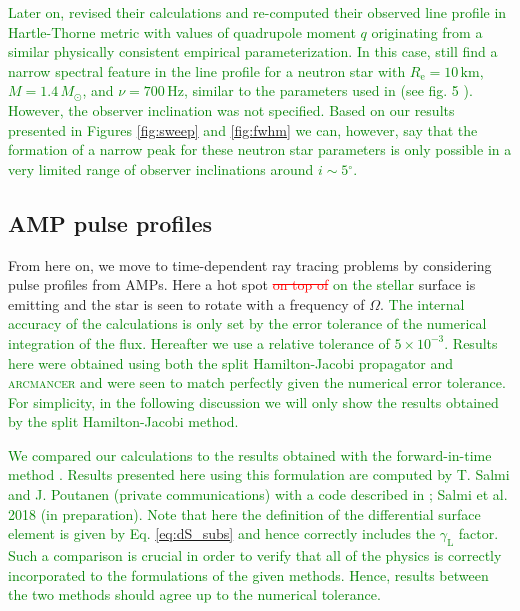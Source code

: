 \documentclass{aa}
\newcommand{\refe}[1]{\textcolor{green}{{#1}}}
\newcommand{\refedel}[1]{\textcolor{red}{\sout{#1}}}
\newcommand{\Msun}{\ensuremath{M_{\odot}}}
\newcommand{\lgamma}{\gamma_{\text{L}}}
\renewcommand{\deg}{\ensuremath{^{\circ}}}
\begin{document}
\refe{
Later on, \citet{BBP13} revised their calculations and re-computed their observed line profile in Hartle-Thorne metric with values of quadrupole moment $q$ originating from a similar physically consistent empirical parameterization.
In this case, \citet{BBP13} still find a narrow spectral feature in the line profile for a neutron star with $R_{\mathrm{e}} = 10\,\mathrm{km}$, $M=1.4\,\Msun$, and $\nu = 700\,\mathrm{Hz}$, similar to the parameters used in \citet{BPO13} (see fig. 5 \citealt{BBP13}).
However, the observer inclination was not specified.
Based on our results presented in Figures \ref{fig:sweep} and \ref{fig:fwhm} we can, however, say that the formation of a narrow peak for these neutron star parameters is only possible in a very limited range of observer inclinations around $i \sim 5\deg$.
}




\subsection{AMP pulse profiles}\label{sect:AMPs}

From here on, we move to time-dependent ray tracing problems by considering pulse profiles from AMPs.
Here a hot spot \refedel{on top of} \refe{on the stellar} surface is emitting and the star is seen to rotate with a frequency of $\Omega$.
\refe{The internal accuracy of the calculations is only set by the error tolerance of the numerical integration of the flux.
Hereafter we use a relative tolerance of $5 \times 10^{-3}$.
Results here were obtained using both the split Hamilton-Jacobi propagator and \textsc{arcmancer} and were seen to match perfectly given the numerical error tolerance.
For simplicity, in the following discussion we will only show the results obtained by the split Hamilton-Jacobi method.
}

\refe{
We compared our calculations to the results obtained with the forward-in-time method \citep[see e.g.,][]{PB06, MLCB07}.
Results presented here using this formulation are computed by T. Salmi and J. Poutanen (private communications) with a code described in \citet{PB06}; Salmi et al. 2018 (in preparation).
Note that here the definition of the differential surface element is given by Eq. \eqref{eq:dS_subs} and hence correctly includes the $\lgamma$ factor.
Such a comparison is crucial in order to verify that all of the physics is correctly incorporated to the formulations of the given methods.
Hence, results between the two methods should agree up to the numerical tolerance.
}
\end{document}
